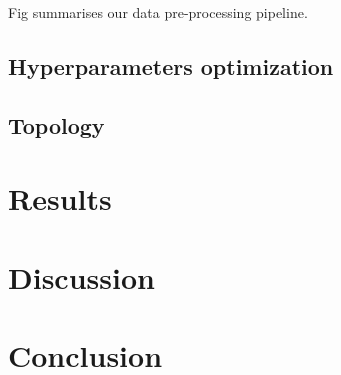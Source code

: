 \documentclass[british,12p]{article}
\begin{document}
    	Fig summarises our data pre-processing pipeline. 
    	
    	
    	
    \subsection{Hyperparameters optimization}
    \subsection{Topology}

    \section{Results}
    \section{Discussion}
    \section{Conclusion}
           
            
      \printbibliography
    
\end{document}
